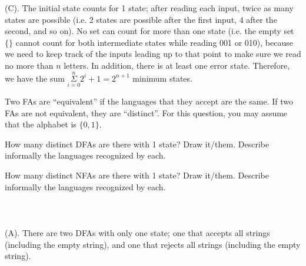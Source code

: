 \documentclass[solution, letterpaper]{cs121}
\begin{document}
\begin{center}
\end{center}
(C).  The initial state counts for 1 state; after reading each input, twice as many states are possible (i.e. 2 states are possible after the first input, 4 after the second, and so on).  No set can count for more than one state (i.e. the empty set $\{\}$ cannot count for both intermediate states while reading 001 or 010), because we need to keep track of the inputs leading up to that point to make sure we read no more than $n$ letters.  In addition, there is at least one error state.  Therefore, we have the sum $\underset{i=0}{\overset{n}{\Sigma}}2^i + 1 = 2^{n+1}$ minimum states.

Two FAs are ``equivalent'' if the languages that they accept are the same. If two FAs are not equivalent, they are ``distinct''. For this question, you may assume that the alphabet is $\{0, 1\}$.

\subproblem How many distinct DFAs are there with 1 state? Draw it/them. Describe informally the languages recognized by each.

\subproblem How many distinct NFAs are there with 1 state? Draw it/them. Describe informally the languages recognized by each.
\\\\
\\\\(A). There are two DFAs with only one state; one that accepts all strings (including the empty string), and one that rejects all strings (including the empty string).
\end{document}
